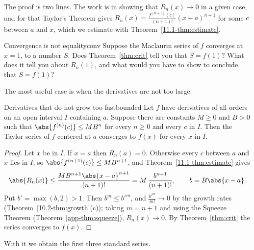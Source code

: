 \documentclass[11pt]{article}
\begin{document}
The proof is two lines. The work is in showing that $R_n(x)\to0$ in a given case, and for that Taylor's Theorem gives $R_n(x)=\frac{f^{(n+1)}(c)}{(n+1)!}(x-a)^{n+1}$ for some $c$ between $a$ and $x$, which we estimate with Theorem~\ref{11.1-thm:estimate}.

\begin{think}{Convergence is not equality}{conv}
Suppose the Maclaurin series of $f$ converges at $x=1$, to a number $S$. Does Theorem~\ref{thm:crit} tell you that $S=f(1)$? What does it tell you about $R_n(1)$, and what would you have to show to conclude that $S=f(1)$?
\end{think}

The most useful case is when the derivatives are not too large.

\begin{thm}{Derivatives that do not grow too fast}{bounded}
Let $f$ have derivatives of all orders on an open interval $I$ containing $a$. Suppose there are constants $M\ge0$ and $B>0$ such that $\abs{f^{(n)}(c)}\le MB^n$ for every $n\ge0$ and every $c$ in $I$. Then the Taylor series of $f$ centered at $a$ converges to $f(x)$ for every $x$ in $I$.
\end{thm}
\begin{proof}
Let $x$ be in $I$. If $x=a$ then $R_n(a)=0$. Otherwise every $c$ between $a$ and $x$ lies in $I$, so $\abs{f^{(n+1)}(c)}\le MB^{n+1}$, and Theorem~\ref{11.1-thm:estimate} gives
\[
\abs{R_n(x)}\le\frac{MB^{n+1}\abs{x-a}^{n+1}}{(n+1)!}=M\,\frac{b^{n+1}}{(n+1)!},\qquad b=B\abs{x-a}.
\]
Put $b'=\max(b,2)>1$. Then $b^{m}\le b'^m$, and $\frac{b'^m}{m!}\to0$ by the growth rates (Theorem~\ref{10.2-thm:growth}(c)); taking $m=n+1$ and using the Squeeze Theorem (Theorem~\ref{app-thm:squeeze}), $R_n(x)\to0$. By Theorem~\ref{thm:crit} the series converges to $f(x)$.
\end{proof}

With it we obtain the first three standard series.
\end{document}
